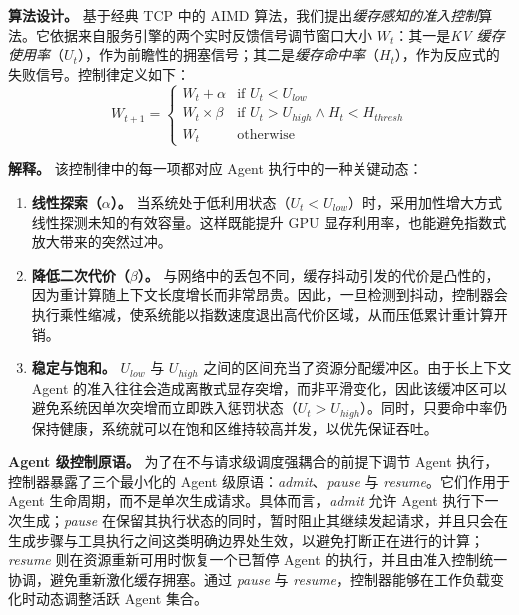\noindent\textbf{算法设计。}
基于经典 TCP 中的 AIMD 算法，我们提出\emph{缓存感知的准入控制}算法。它依据来自服务引擎的两个实时反馈信号调节窗口大小 $W_t$：其一是\emph{KV 缓存使用率}（$U_t$），作为前瞻性的拥塞信号；其二是\emph{缓存命中率}（$H_t$），作为反应式的失败信号。控制律定义如下：
\begin{equation}
W_{t+1} = \begin{cases}
    W_t + \alpha & \text{if } U_t < U_{low} \\
    W_t \times \beta & \text{if } U_t > U_{high} \land H_t < H_{thresh} \\
    W_t & \text{otherwise}
\end{cases}
\end{equation}

\noindent\textbf{解释。}
该控制律中的每一项都对应 Agent 执行中的一种关键动态：

\begin{enumerate}[leftmargin=*,nosep]
    \item[(1)] \textbf{线性探索（$\alpha$）。}
    当系统处于低利用状态（$U_t < U_{low}$）时，采用加性增大方式线性探测未知的有效容量。这样既能提升 GPU 显存利用率，也能避免指数式放大带来的突然过冲。

    \item[(2)] \textbf{降低二次代价（$\beta$）。}
    与网络中的丢包不同，缓存抖动引发的代价是凸性的，因为重计算随上下文长度增长而非常昂贵。因此，一旦检测到抖动，控制器会执行乘性缩减，使系统能以指数速度退出高代价区域，从而压低累计重计算开销。

    \item[(3)] \textbf{稳定与饱和。}
    $U_{low}$ 与 $U_{high}$ 之间的区间充当了资源分配缓冲区。由于长上下文 Agent 的准入往往会造成离散式显存突增，而非平滑变化，因此该缓冲区可以避免系统因单次突增而立即跌入惩罚状态（$U_t > U_{high}$）。同时，只要命中率仍保持健康，系统就可以在饱和区维持较高并发，以优先保证吞吐。
\end{enumerate}

\noindent\textbf{Agent 级控制原语。}
为了在不与请求级调度强耦合的前提下调节 Agent 执行，控制器暴露了三个最小化的 Agent 级原语：\emph{admit}、\emph{pause} 与 \emph{resume}。它们作用于 Agent 生命周期，而不是单次生成请求。具体而言，\emph{admit} 允许 Agent 执行下一次生成；\emph{pause} 在保留其执行状态的同时，暂时阻止其继续发起请求，并且只会在生成步骤与工具执行之间这类明确边界处生效，以避免打断正在进行的计算；\emph{resume} 则在资源重新可用时恢复一个已暂停 Agent 的执行，并且由准入控制统一协调，避免重新激化缓存拥塞。通过 \emph{pause} 与 \emph{resume}，控制器能够在工作负载变化时动态调整活跃 Agent 集合。
